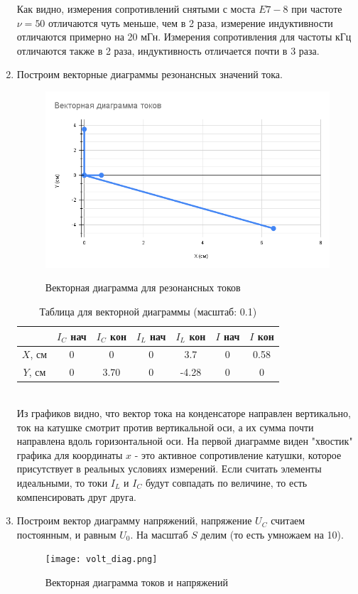 \documentclass[a4paper, 12pt]{article}
\begin{document}
\begin{enumerate}
    Как видно, измерения сопротивлений снятыми с моста $E7-8$ при частоте $\nu = 50$ отличаются чуть меньше, чем в 2 раза, измерение индуктивности отличаются примерно на 20 мГн.
    Измерения сопротивления для частоты кГц отличаются также в 2 раза, индуктивность отличается почти в 3 раза.
    \item Построим векторные диаграммы резонансных значений тока.
    \begin{figure}[htbp]
        \centering
        \includegraphics[width=0.7\linewidth]{vec_diag.png}
        \label{треугольная векторная диаграмма}
        \caption{Векторная диаграмма для резонансных токов}
    \end{figure}
    \begin{table}[htbp]
        \centering
        \begin{tabular}{|c|c|c|c|c|c|c|}
            \hline
            & $I_{C}$ нач & $I_{C}$ кон & $I_{L}$ нач & $I_{L}$ кон & $I$ нач & $I$ кон \\
            \hline
            $X$, см & 0 & 0 & 0 & 3.7 & 0 & 0.58 \\
            $Y$, см & 0 & 3.70 & 0 & -4.28 & 0 & 0 \\
            \hline
        \end{tabular}
        \caption{Таблица для векторной диаграммы (масштаб: 0.1)}
        \label{Таблица для векторной диаграммы (масштаб: 0.1)}
    \end{table}\\
    Из графиков видно, что вектор тока на конденсаторе направлен вертикально, ток на катушке смотрит против вертикальной оси, а их сумма
    почти направлена вдоль горизонтальной оси. На первой диаграмме виден "хвостик" графика для координаты $x$ - это активное сопротивление катушки,
    которое присутствует в реальных условиях измерений. Если считать элементы идеальными, то токи $I_{L}$ и $I_{C}$ будут совпадать по величине, то есть компенсировать друг друга.
    \item Построим вектор диаграмму напряжений, напряжение $U_{C}$ считаем постоянным, и равным $U_{0}$.
    На масштаб $S$ делим (то есть умножаем на 10).
    \begin{figure}[H]
        \centering
        \texttt{[image: volt\_diag.png]}
        \label{Векторная диаграмма токов и напряжений}
        \caption{Векторная диаграмма токов и напряжений}
    \end{figure}

\end{enumerate}
\end{document}
